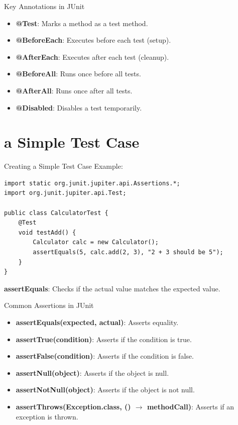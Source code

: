 \documentclass{beamer}
\begin{document}
\begin{frame}{Key Annotations in JUnit}
	\begin{itemize}
		\item \textbf{@Test}: Marks a method as a test method.
		\item \textbf{@BeforeEach}: Executes before each test (setup).
		\item \textbf{@AfterEach}: Executes after each test (cleanup).
		\item \textbf{@BeforeAll}: Runs once before all tests.
		\item \textbf{@AfterAll}: Runs once after all tests.
		\item \textbf{@Disabled}: Disables a test temporarily.
	\end{itemize}
\end{frame}

\section{a Simple Test Case}

\begin{frame}[fragile]{Creating a Simple Test Case}
	Example:
	\begin{lstlisting}
import static org.junit.jupiter.api.Assertions.*;
import org.junit.jupiter.api.Test;

public class CalculatorTest {
    @Test
    void testAdd() {
        Calculator calc = new Calculator();
        assertEquals(5, calc.add(2, 3), "2 + 3 should be 5");
    }
}
	\end{lstlisting}
	\textbf{assertEquals}: Checks if the actual value matches the expected value.
\end{frame}

\begin{frame}{Common Assertions in JUnit}
	\begin{itemize}
		\item \textbf{assertEquals(expected, actual)}: Asserts equality.
		\item \textbf{assertTrue(condition)}: Asserts if the condition is true.
		\item \textbf{assertFalse(condition)}: Asserts if the condition is false.
		\item \textbf{assertNull(object)}: Asserts if the object is null.
		\item \textbf{assertNotNull(object)}: Asserts if the object is not null.
		\item \textbf{assertThrows(Exception.class, () $\rightarrow$ methodCall)}: Asserts if an exception is thrown.
	\end{itemize}
\end{frame}
\end{document}
